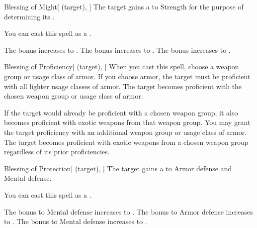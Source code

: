 \lowercase{\hypertarget{spell:Blessing of Might}{}}\label{spell:Blessing of Might}
\begin{attuneability}[Rank 1]{\hypertarget{spell:Blessing of Might}{Blessing of Might}}[ (target), ]
The target gains a   to Strength for the purpose of determining its .

You can cast this spell as a .

\rankline
{} The bonus increases to .
 The bonus increases to .
 The bonus increases to .
\end{attuneability}
\vspace{0.25em}



\lowercase{\hypertarget{spell:Blessing of Proficiency}{}}\label{spell:Blessing of Proficiency}
\begin{attuneability}[Rank 1]{\hypertarget{spell:Blessing of Proficiency}{Blessing of Proficiency}}[ (target), ]
When you cast this spell, choose a weapon group or usage class of armor.
If you choose armor, the target must be proficient with all lighter usage classes of armor.
The target becomes proficient with the chosen weapon group or usage class of armor.

\rankline
{} If the target would already be proficient with a chosen weapon group, it also becomes proficient with exotic weapons from that weapon group.
 You may grant the target proficiency with an additional weapon group or usage class of armor.
 The target becomes proficient with exotic weapons from a chosen weapon group regardless of its prior proficiencies.
\end{attuneability}
\vspace{0.25em}



\lowercase{\hypertarget{spell:Blessing of Protection}{}}\label{spell:Blessing of Protection}
\begin{attuneability}[Rank 1]{\hypertarget{spell:Blessing of Protection}{Blessing of Protection}}[ (target), ]
The target gains a   to Armor defense and Mental defense.

You can cast this spell as a .

\rankline
{} The bonus to Mental defense increases to .
 The bonus to Armor defense increases to .
 The bonus to Mental defense increases to .
\end{attuneability}
\vspace{0.25em}



